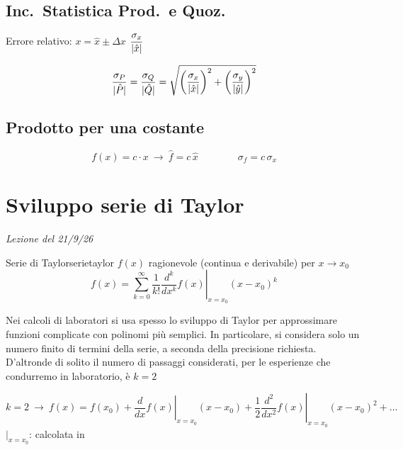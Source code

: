 \documentclass[11pt,a4paper,oneside]{book}
\newcommand{\lezione}[1]{\par\medskip\noindent
  {\small\itshape\color{grigio}Lezione del #1}\par\smallskip}
\newcommand{\grigio}[1]{{\color{grigio}#1}}
\DeclarePairedDelimiter{\abs}{\lvert}{\rvert}
\begin{document}
\subsection*{Inc.\ Statistica Prod.\ e Quoz.}
Errore relativo: \quad $x = \hat{x} \pm \Delta x$ \qquad $\dfrac{\sigma_x}{\abs{\hat{x}}}$
\begin{formulabox}
\[
  \frac{\sigma_P}{\abs{\hat{P}}} = \frac{\sigma_Q}{\abs{\hat{Q}}} = \sqrt{\left( \frac{\sigma_x}{\abs{\hat{x}}} \right)^2 + \left( \frac{\sigma_y}{\abs{\hat{y}}} \right)^2}
\]
\end{formulabox}

\subsection*{Prodotto per una costante}
\[
  f(x) = c \cdot x \ \to\ \hat{f} = c\,\hat{x} \qquad\qquad \sigma_f = c\,\sigma_x
\]

\newpage
\section{Sviluppo serie di Taylor}
\lezione{21/9/26}

\begin{definizione}{Serie di Taylor}{serietaylor}
\newline $f(x)$ \grigio{ragionevole (continua e derivabile)} \newline \qquad per $x \to x_0$
\[
  f(x) = \sum_{k=0}^{\infty} \frac{1}{k!} \left. \frac{d^k}{dx^k} f(x) \right|_{x = x_0} (x - x_0)^k
\]
\end{definizione}

\begin{nota}
Nei calcoli di laboratori si usa spesso lo sviluppo di Taylor per approssimare funzioni complicate con polinomi più semplici. In particolare, si considera solo un numero finito di termini della serie, a seconda della precisione richiesta.
\newline\newline
D'altronde di solito il numero di passaggi considerati, per le esperienze che condurremo in laboratorio, è $k=2$
\end{nota}

\[
  k = 2 \ \to\ f(x) = f(x_0) + \left. \frac{d}{dx} f(x) \right|_{x = x_0} (x - x_0) + \frac{1}{2} \left. \frac{d^2}{dx^2} f(x) \right|_{x = x_0} (x - x_0)^2 + \ldots
\]
\grigio{$\big|_{x = x_0}$: calcolata in}
\end{document}
